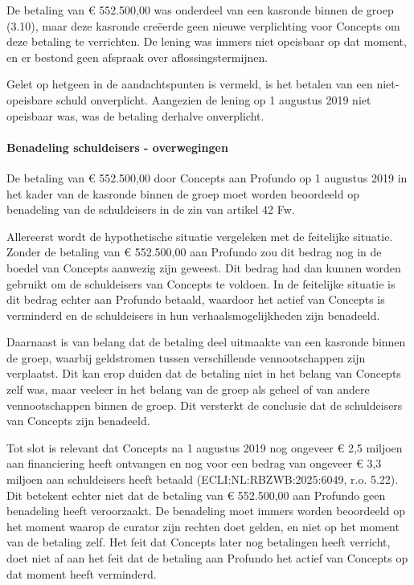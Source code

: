 \documentclass[
  dutch,
  a4paper,
]{article}
\begin{document}
De betaling van € 552.500,00 was onderdeel van een kasronde binnen de groep (3.10), maar deze kasronde creëerde geen nieuwe verplichting voor Concepts om deze betaling te verrichten. De lening was immers niet opeisbaar op dat moment, en er bestond geen afspraak over aflossingstermijnen.

Gelet op hetgeen in de aandachtspunten is vermeld, is het betalen van een niet-opeisbare schuld onverplicht. Aangezien de lening op 1 augustus 2019 niet opeisbaar was, was de betaling derhalve onverplicht.

\paragraph{Benadeling schuldeisers - overwegingen}\label{benadeling-schuldeisers---overwegingen-42}

De betaling van € 552.500,00 door Concepts aan Profundo op 1 augustus 2019 in het kader van de kasronde binnen de groep moet worden beoordeeld op benadeling van de schuldeisers in de zin van artikel 42 Fw.

Allereerst wordt de hypothetische situatie vergeleken met de feitelijke situatie. Zonder de betaling van € 552.500,00 aan Profundo zou dit bedrag nog in de boedel van Concepts aanwezig zijn geweest. Dit bedrag had dan kunnen worden gebruikt om de schuldeisers van Concepts te voldoen. In de feitelijke situatie is dit bedrag echter aan Profundo betaald, waardoor het actief van Concepts is verminderd en de schuldeisers in hun verhaalsmogelijkheden zijn benadeeld.

Daarnaast is van belang dat de betaling deel uitmaakte van een kasronde binnen de groep, waarbij geldstromen tussen verschillende vennootschappen zijn verplaatst. Dit kan erop duiden dat de betaling niet in het belang van Concepts zelf was, maar veeleer in het belang van de groep als geheel of van andere vennootschappen binnen de groep. Dit versterkt de conclusie dat de schuldeisers van Concepts zijn benadeeld.

Tot slot is relevant dat Concepts na 1 augustus 2019 nog ongeveer € 2,5 miljoen aan financiering heeft ontvangen en nog voor een bedrag van ongeveer € 3,3 miljoen aan schuldeisers heeft betaald (ECLI:NL:RBZWB:2025:6049, r.o. 5.22). Dit betekent echter niet dat de betaling van € 552.500,00 aan Profundo geen benadeling heeft veroorzaakt. De benadeling moet immers worden beoordeeld op het moment waarop de curator zijn rechten doet gelden, en niet op het moment van de betaling zelf. Het feit dat Concepts later nog betalingen heeft verricht, doet niet af aan het feit dat de betaling aan Profundo het actief van Concepts op dat moment heeft verminderd.
\end{document}
